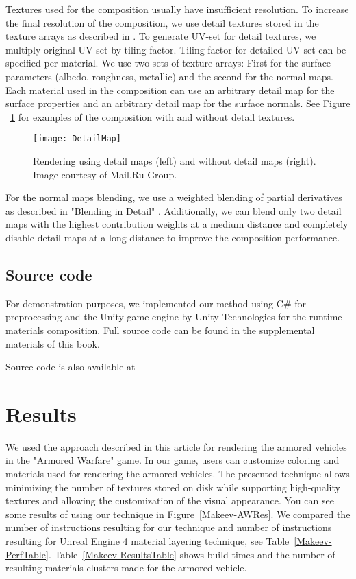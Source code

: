 Textures used for the composition usually have insufficient resolution.
To increase the final resolution of the composition, we use detail textures stored in the texture arrays as described in \cite{BFPhotogrammetry}.
To generate UV-set for detail textures, we multiply original UV-set by tiling factor.
Tiling factor for detailed UV-set can be specified per material.
We use two sets of texture arrays: First for the surface parameters (albedo, roughness, metallic) and the second for the normal maps.
Each material used in the composition can use an arbitrary detail map for the surface properties and an arbitrary detail map for the surface normals.
See Figure ~\ref{Makeev-SurfaceDetails} for examples of the composition with and without detail textures. 

\begin{figure}\centering
\texttt{[image: DetailMap]}
\caption{Rendering using detail maps (left) and without detail maps (right). Image courtesy of Mail.Ru Group.} \label{Makeev-SurfaceDetails}
\end{figure}

For the normal maps blending, we use a weighted blending of partial derivatives as described in "Blending in Detail" \cite{NormalsBlending}.
Additionally, we can blend only two detail maps with the highest contribution weights at a medium distance and completely disable detail maps at a long distance to improve the composition performance.

\subsection{Source code}

For demonstration purposes, we implemented our method using C\# for preprocessing and the Unity game engine by Unity Technologies for the runtime materials composition.
Full source code can be found in the supplemental materials of this book.


Source code is also available at \underline{}

\section{Results}

We used the approach described in this article for rendering the armored vehicles in the "Armored Warfare" game.
In our game, users can customize coloring and materials used for rendering the armored vehicles.
The presented technique allows minimizing the number of textures stored on disk while supporting high-quality textures and allowing the customization of the visual appearance.
You can see some results of using our technique in Figure~\ref{Makeev-AWRes}.
We compared the number of instructions resulting for our technique and number of instructions resulting for Unreal Engine 4 material layering technique, see Table~\ref{Makeev-PerfTable}.
Table~\ref{Makeev-ResultsTable} shows build times and the number of resulting materials clusters made for the armored vehicle.

